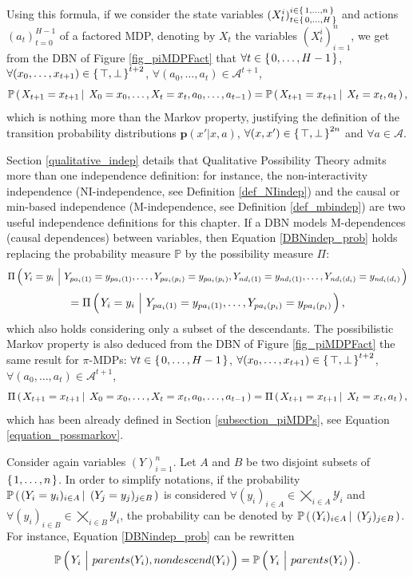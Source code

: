 Using this formula, if we consider the state variables $(X^i_t)_{t \in \left\{ \left. 0,\ldots,H \right. \right\}}^{i \in \left\{ \left. 1,\ldots,n \right. \right\}}$
and actions $(a_t)_{t=0}^{H-1}$
of a factored MDP, 
denoting by $X_t$ the variables $(X^i_t)_{i=1}^n$,
we get from the DBN of Figure \ref{fig_piMDPFact} that
$\forall t \in \left\{ \left.  0,\ldots, H-1 \right. \right\}$, $\forall (x_0,\ldots,x_{t+1}) \in \left\{ \left.  \top, \bot  \right. \right\}^{t+2}$, $\forall (a_0,\ldots,a_t) \in \mathcal{A}^{t+1}$,
\[ \mathbb{P} \left( \left.  X_{t+1}=x_{t+1} \, \right| \left. \, X_0=x_0, \ldots, X_t=x_t, a_0,\ldots,a_{t-1}  \right. \right) = \mathbb{P} \left( \left.  X_{t+1}=x_{t+1} \, \right| \left. \, X_t=x_t, a_t  \right. \right), \]
which is nothing more than the Markov property,
justifying the definition of the transition probability distributions $\textbf{p}(x' \vert x, a)$,
$\forall (x,x') \in \left\{ \left.  \top, \bot  \right. \right\}^{2n}$ and $\forall a \in \mathcal{A}$.

Section \ref{qualitative_indep} details that Qualitative Possibility Theory 
admits more than one independence definition:
for instance, the non-interactivity independence (NI-independence, see Definition \ref{def_NIindep}) 
and the causal or min-based independence (M-independence, see Definition \ref{def_mbindep})
are two useful independence definitions for this chapter.
If a DBN models M-dependences (causal dependences) 
between variables, 
then Equation \ref{DBNindep_prob} holds 
replacing the probability measure $\mathbb{P}$ 
by the possibility measure $\Pi$:
\[\Pi \paren{ Y_i=y_i \ \Big\vert \ Y_{pa_i(1)}=y_{pa_i(1)},\ldots, Y_{pa_i(p_i)}=y_{pa_i(p_i)}, Y_{nd_i(1)} = y_{nd_i(1)}, \ldots, Y_{nd_i(d_i)} = y_{nd_i(d_i)} }  \]
\begin{equation}
\label{DBN_M_indep}
= \Pi \left( \left.  Y_i=y_i \ \Big\vert \ Y_{pa_i(1)}=y_{pa_i(1)},\ldots, Y_{pa_i(p_i)}=y_{pa_i(p_i)}  \right. \right),
\end{equation}
which also holds considering only a subset of the descendants.
The possibilistic Markov property is also deduced from 
the DBN of Figure \ref{fig_piMDPFact} the same result for $\pi$-MDPs:
$\forall t \in \left\{ \left.  0,\ldots, H-1 \right. \right\}$, $\forall (x_0,\ldots,x_{t+1}) \in \left\{ \left.  \top, \bot  \right. \right\}^{t+2}$, $\forall (a_0,\ldots,a_t) \in \mathcal{A}^{t+1}$,
\[ \Pi \left( \left.  X_{t+1}=x_{t+1} \, \right| \left. \, X_0=x_0, \ldots, X_t=x_t, a_0,\ldots,a_{t-1}  \right. \right) = \Pi \left( \left.  X_{t+1}=x_{t+1} \, \right| \left. \, X_t=x_t, a_t  \right. \right), \]
which has been already defined in Section \ref{subsection_piMDPs}, see Equation \ref{equation_possmarkov}.

Consider again variables $(Y)_{i=1}^n$.
Let $A$ and $B$ be two disjoint subsets
of $\left\{ \left. 1,\ldots,n \right. \right\}$. 
In order to simplify notations,
if the probability 
$\mathbb{P} \left( \left.  (Y_i=y_i)_{i \in A} \, \right| \left. \, (Y_j=y_j)_{j \in B}   \right. \right)$
is considered $\forall (y_i)_{i \in A} \in \bigtimes_{i \in A} \mathcal{Y}_i$
and $\forall(y_i)_{i \in B} \in \bigtimes_{i \in B} \mathcal{Y}_i$,
the probability can be denoted by 
$\mathbb{P} \left( \left.  (Y_i)_{i \in A} \, \right| \left. \, (Y_j)_{j \in B}  \right. \right)$.
For instance, Equation \ref{DBNindep_prob} can be rewritten
\[ \mathbb{P} \paren{ Y_i \ \Big\vert \ parents(Y_i), nondescend(Y_i) } = \mathbb{P} \paren{ Y_i \ \Big\vert \ parents(Y_i) }. \]

